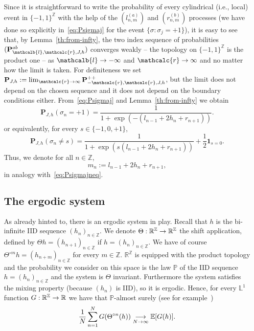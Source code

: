 \documentclass[AHL,Unicode,longabstracts,published]{cedram}
\newcommand{\ind}{\mathbf{1}}
\newcommand{\bP}{\mathbf{P}}
\newcommand{\bbE}{\mathbb{E}}
\newcommand{\bbL}{\mathbb{L}}
\newcommand{\bbP}{\mathbb{P}}
\newcommand{\bbR}{\mathbb{R}}
\newcommand{\bbZ}{\mathbb{Z}}
\newcommand{\gs}{\sigma}
\renewcommand{\ell}{\mathcalb{l}}
\newcommand{\err}{\mathcalc{r}}
\renewcommand*{\to}{\mathchoice{\longrightarrow}{\rightarrow}{\rightarrow}{\rightarrow}}
\begin{document}
Since it is straightforward to write the probability of every cylindrical (i.e., local) event in $\{-1,1\}^\bbZ$ with the help of the $(l_{n, m}^{(a)})$ and $(r_{n,m}^{(b)})$ processes (we have done so explicitly in~\eqref{eq:Psigmaj} for the event $\{\gs: \gs_j=+1\}$), it is easy to see that, by Lemma~\ref{th:from-infty}, the two index sequence of probabilities $(\bP^{ab}_{\ell, \err, J, h})$ converges weakly -- the topology on $\{-1,1\}^\bbZ$ is the product one -- as $\ell \to -\infty$ and $\err \to \infty$ and no matter how the limit is taken. For definiteness we set $\bP_{ J, h}:= \lim_{\err \to \infty}\bP^{++}_{-\err, \err, J, h}$, but the limit does not depend on the chosen sequence and it does not depend on the boundary conditions either. From~\eqref{eq:Psigmaj} and Lemma~\ref{th:from-infty} we obtain
\begin{equation}\label{eq:Psigmajinf}
\bP_{ J, h}\left(\gs_n=+1\right)=
\frac 1 {1+ \exp\left(-\left(l_{n-1} + 2h_n+ r_{n+1}\right)\right)}.
\end{equation}
or equivalently, for every $s\in\{-1,0, +1\}$,
\begin{equation}\label{eq:Psigmajneqinf}
\bP_{ J, h}\left(\gs_n\neq s\right)=
\frac {1} {1+ \exp\left(s\left(l_{n-1} + 2h_n+ r_{n+1}\right)\right)}+\frac12\ind_{s=0}.
\end{equation}
Thus, we denote for all $n\in\bbZ$,
\begin{equation}\label{def-mn}
m_n:=l_{n-1} + 2h_n+ r_{n+1},
\end{equation}
in analogy with~\eqref{eq:Psigmajneq}.



\subsection{The ergodic system}

As already hinted to, there is an ergodic system in play. Recall that $h$ is the bi-infinite IID sequence $(h_n)_{n\in\bbZ}$. We denote $\Theta:\bbR^\bbZ\to \bbR^\bbZ$ the shift application, defined by $\Theta h=(h_{n+1})_{n\in \bbZ}$ if $h=(h_n)_{n\in\bbZ}$. We have of course $\Theta^{\circ m} h=(h_{n+m})_{n\in\bbZ}$ for every $m\in\bbZ$. $\bbR^\bbZ$ is equipped with the product topology and the probability we consider on this space is the law $\bbP$ of the IID sequence $h=(h_n)_{n\in\bbZ}$ and the system is $\Theta$ invariant. Furthermore the system satisfies the mixing property (because $(h_n)$ is IID), so it is ergodic. Hence, for every $\bbL^1$ function $G:\bbR^\bbZ \to \bbR$ we have that $\bbP$-almost surely (see for example~\cite[Chapter~5]{cf:MC})
\begin{equation}\label{eq:generalergstat}
\frac1N\sum_{n=1}^N G(\Theta^{\circ n}(h))\underset{N\to\infty}{\to} \bbE[G(h)].
\end{equation}
\medskip
\end{document}
